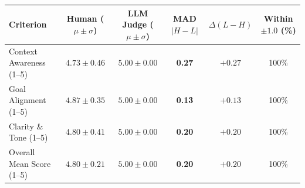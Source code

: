 \begin{tabular}{lccccc}
\toprule
Criterion & Human ($\mu \pm \sigma$) & LLM Judge ($\mu \pm \sigma$) & MAD $|H - L|$ & $\Delta (L - H)$ & Within $\pm 1.0$ (\%) \\
\midrule
Context Awareness (1--5) & $4.73 \pm 0.46$ & $5.00 \pm 0.00$ & \textbf{0.27} & $+0.27$ & 100\% \\
Goal Alignment (1--5) & $4.87 \pm 0.35$ & $5.00 \pm 0.00$ & \textbf{0.13} & $+0.13$ & 100\% \\
Clarity \& Tone (1--5) & $4.80 \pm 0.41$ & $5.00 \pm 0.00$ & \textbf{0.20} & $+0.20$ & 100\% \\
Overall Mean Score (1--5) & $4.80 \pm 0.21$ & $5.00 \pm 0.00$ & \textbf{0.20} & $+0.20$ & 100\% \\
\bottomrule
\end{tabular}
